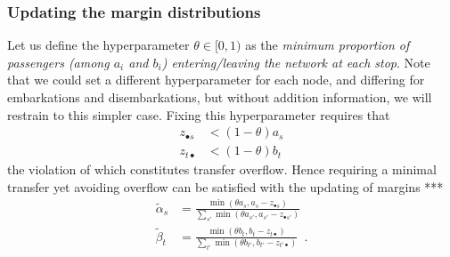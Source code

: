 \documentclass{bmcart}
\begin{document}
{\subsubsection{Updating  the margin distributions}
\label{marginup}
Let us define the hyperparameter $ \theta\in [0, 1)$ as the \emph{minimum proportion of passengers (among $a_i$ and $b_i$) entering/leaving the network at each stop}. Note that we could set a different hyperparameter for each node, and differing for embarkations and disembarkations, but without addition information, we will restrain to this simpler case. Fixing this hyperparameter requires that
\begin{align}
\label{constz}
	z_{\bullet s} &< (1 - \theta) a_s \\
	z_{t \bullet} &< (1 - \theta) b_t
\end{align}
the violation of which constitutes transfer overflow. Hence requiring a minimal transfer yet avoiding overflow can be satisfied with the updating of margins ***
\begin{align}
	\widetilde{\alpha}_s &= \frac{\min(\theta a_s, a_s - z_{\bullet s})}{\sum_{s'} \min(\theta a_{s'}, a_{s'} - z_{\bullet {s'}})} \label{alpha_update} \\
	\widetilde{\beta}_t &= \frac{\min(\theta b_t, b_t - z_{t \bullet})}{\sum_{t'} \min(\theta b_{t'}, b_{t'} - z_{{t'} \bullet})} \label{beta_update}\enspace. 
\end{align}

}
\end{document}
